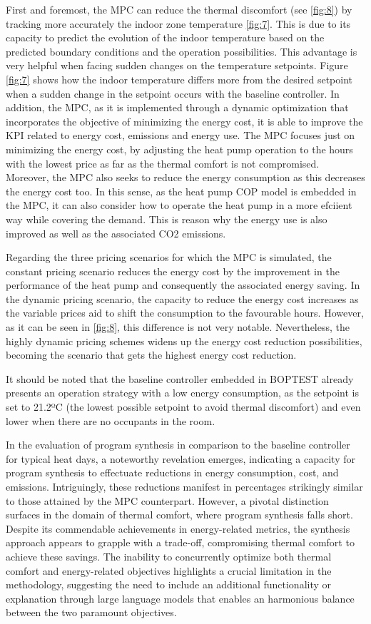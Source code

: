 First and foremost, the MPC can reduce the thermal discomfort (see \ref{fig:8}) by tracking more accurately the indoor zone temperature \ref{fig:7}. This is due to its capacity to predict the evolution of the indoor temperature based on the predicted boundary conditions and the operation possibilities. This advantage is very helpful when facing sudden changes on the temperature setpoints. Figure \ref{fig:7} shows how the indoor temperature differs more from the desired setpoint when a sudden change in the setpoint occurs with the baseline controller. In addition, the MPC, as it is implemented through a dynamic optimization that incorporates the objective of minimizing the energy cost, it is able to improve the KPI related to energy cost, emissions and energy use. The MPC focuses just on minimizing the energy cost, by adjusting the heat pump operation to the hours with the lowest price as far as the thermal comfort is not compromised. Moreover, the MPC also seeks to reduce the energy consumption as this decreases the energy cost too. In this sense, as the heat pump COP model is embedded in the MPC, it can also consider how to operate the heat pump in a more efciient way while covering the demand. This is reason why the energy use is also improved as well as the associated CO2 emissions.

Regarding the three pricing scenarios for which the MPC is simulated, the constant pricing scenario reduces the energy cost by the improvement in the performance of the heat pump and consequently the associated energy saving. In the dynamic pricing scenario, the capacity to reduce the energy cost increases as the variable prices aid to shift the consumption to the favourable hours. However, as it can be seen in \ref{fig:8}, this difference is not very notable. Nevertheless, the highly dynamic pricing schemes widens up the energy cost reduction possibilities, becoming the scenario that gets the highest energy cost reduction.

It should be noted that the baseline controller embedded in BOPTEST already presents an operation strategy with a low energy consumption, as the setpoint is set to 21.2ºC (the lowest possible setpoint to avoid thermal discomfort) and even lower when there are no occupants in the room.

In the evaluation of program synthesis in comparison to the baseline controller for typical heat days, a noteworthy revelation emerges, indicating a capacity for program synthesis to effectuate reductions in energy consumption, cost, and emissions. Intriguingly, these reductions manifest in percentages strikingly similar to those attained by the MPC counterpart. However, a pivotal distinction surfaces in the domain of thermal comfort, where program synthesis falls short. Despite its commendable achievements in energy-related metrics, the synthesis approach appears to grapple with a trade-off, compromising thermal comfort to achieve these savings. The inability to concurrently optimize both thermal comfort and energy-related objectives highlights a crucial limitation in the methodology, suggesting the need to include an additional functionality or explanation through large language models that enables an harmonious balance between the two paramount objectives.

